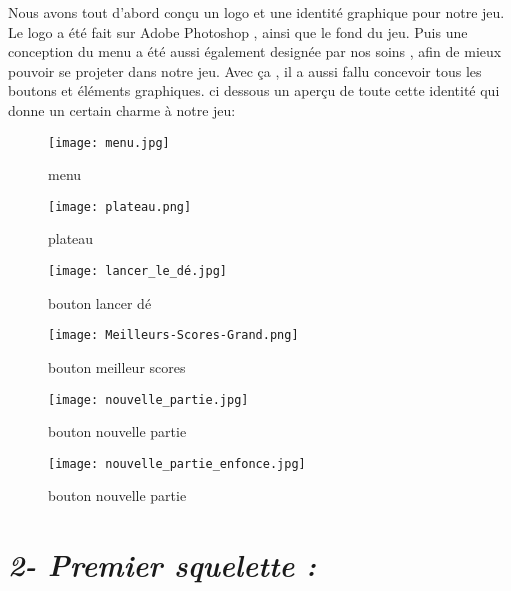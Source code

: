 \documentclass[12pt, openany]{report}
\begin{document}
\large {Nous avons tout d'abord conçu un logo et une identité graphique pour notre jeu. Le logo a été fait sur Adobe Photoshop , ainsi que le fond du jeu. 
Puis une conception du menu a été aussi également designée par nos soins , afin de mieux pouvoir se projeter dans notre jeu. 
Avec ça , il a aussi fallu concevoir tous les boutons et éléments graphiques. 
ci dessous un aperçu de toute cette identité qui donne un certain charme à notre jeu:}


\begin{figure}[h]
    \begin{minipage}[c]{.46\linewidth}
        \centering
        \texttt{[image: menu.jpg]} 
        \caption{menu}
    \end{minipage}
    \hfill%
    \begin{minipage}[c]{.46\linewidth}
        \centering
        \texttt{[image: plateau.png]}
        \caption{plateau}
    \end{minipage}
\end{figure}

\begin{figure}[h]
      \begin{minipage}[c]{.46\linewidth}
        \centering
        \texttt{[image: lancer\_le\_dé.jpg]} 
        \caption{bouton lancer dé}
    \end{minipage}
    \hfill%
     \hfill%
     \begin{minipage}[c]{.46\linewidth}
        \centering
        \texttt{[image: Meilleurs-Scores-Grand.png]}
        \caption{bouton meilleur scores}
    \end{minipage}
    \hfill%
     \begin{minipage}[c]{.46\linewidth}
        \centering
        \texttt{[image: nouvelle\_partie.jpg]}
        \caption{bouton nouvelle partie}
    \end{minipage}
     \hfill%
     \begin{minipage}[c]{.46\linewidth}
        \centering
        \texttt{[image: nouvelle\_partie\_enfonce.jpg]}        \caption{bouton nouvelle partie}
    \end{minipage}
    \hfill%
    

    
\end{figure}

\newpage

\section*{ \Large\it{2- Premier squelette : } } 
\end{document}
